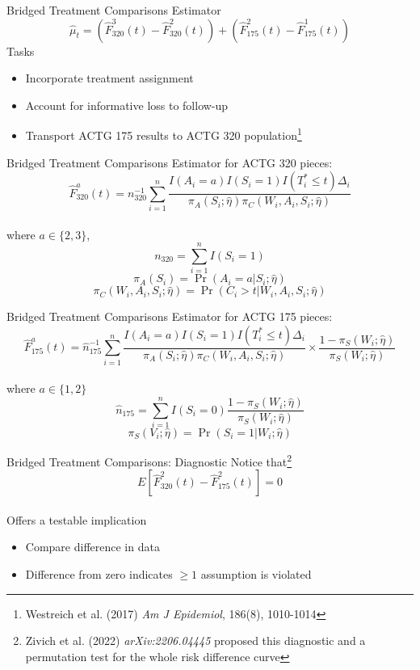 \documentclass{beamer}
\begin{document}
\begin{frame}{Bridged Treatment Comparisons}
	Estimator
	\[\hat{\mu}_t = \left(\hat{F}_{320}^{3}(t) - \hat{F}_{320}^{2}(t)\right) + \left(\hat{F}_{175}^{2}(t) - \hat{F}_{175}^{1}(t)\right)\]
	Tasks
	\begin{itemize}
		\item Incorporate treatment assignment
		\item Account for informative loss to follow-up
		\item Transport ACTG 175 results to ACTG 320 population\footnote[frame]{Westreich et al. (2017) \textit{Am J Epidemiol}, 186(8), 1010-1014}
	\end{itemize}
\end{frame}

\begin{frame}{Bridged Treatment Comparisons}
	Estimator for ACTG 320 pieces:
	\[\hat{F}_{320}^{a}(t) = n_{320}^{-1} \sum_{i=1}^{n} \frac{I(A_i = a) I(S_i = 1) I(T_i^* \le t) \Delta_i}{\pi_A(S_i; \hat{\eta}) \pi_C(W_i, A_i, S_i; \hat{\eta})}\]~\\
	where $a\in\{2,3\}$,
	\[n_{320} = \sum_{i=1}^{n} I(S_i = 1)\]
	\[\pi_A(S_i) = \Pr(A_i=a | S_i; \hat{\eta}) \]
	\[\pi_C(W_i, A_i, S_i; \hat{\eta}) = \Pr(C_i>t | W_i, A_i, S_i; \hat{\eta})\]
\end{frame}

\begin{frame}{Bridged Treatment Comparisons}
	Estimator for ACTG 175 pieces:
	\[\hat{F}_{175}^{a}(t) = \hat{n}_{175}^{-1} \sum_{i=1}^{n} \frac{I(A_i = a) I(S_i = 1) I(T_i^* \le t) \Delta_i}{\pi_A(S_i;\hat{\eta}) \pi_C(W_i, A_i, S_i; \hat{\eta})} \times \frac{1 - \pi_S(W_i; \hat{\eta})}{\pi_S(W_i; \hat{\eta})}\]~\\
	where $a\in\{1,2\}$
	\[\hat{n}_{175} = \sum_{i=1}^{n} I(S_i = 0) \frac{1 - \pi_S(W_i; \hat{\eta})}{\pi_S(W_i; \hat{\eta})}\]
	\[\pi_S(V_i; \hat{\eta}) = \Pr(S_i = 1 | W_i; \hat{\eta})\]
\end{frame}

\begin{frame}{Bridged Treatment Comparisons: Diagnostic}
	Notice that\footnote[frame]{Zivich et al. (2022) \textit{arXiv:2206.04445} proposed this diagnostic and a permutation test for the whole risk difference curve}
	\[E\left[\hat{F}_{320}^{2}(t) - \hat{F}_{175}^{2}(t)\right] = 0\]~\\
	Offers a testable implication
	\begin{itemize}
		\item Compare difference in data
		\item Difference from zero indicates $\ge1$ assumption is violated
	\end{itemize}
\end{frame}
\end{document}
